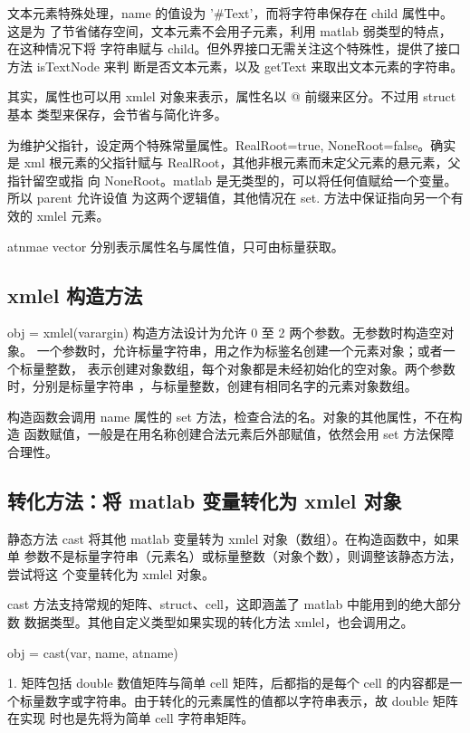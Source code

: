 文本元素特殊处理，name 的值设为 '#Text'，而将字符串保存在 child 属性中。这是为
了节省储存空间，文本元素不会用子元素，利用 matlab 弱类型的特点，在这种情况下将
字符串赋与 child。但外界接口无需关注这个特殊性，提供了接口方法 isTextNode 来判
断是否文本元素，以及 getText 来取出文本元素的字符串。

其实，属性也可以用 xmlel 对象来表示，属性名以 @ 前缀来区分。不过用 struct 基本
类型来保存，会节省与简化许多。

为维护父指针，设定两个特殊常量属性。RealRoot=true, NoneRoot=false。确实是 xml
根元素的父指针赋与 RealRoot，其他非根元素而未定父元素的悬元素，父指针留空或指
向 NoneRoot。matlab 是无类型的，可以将任何值赋给一个变量。所以 parent 允许设值
为这两个逻辑值，其他情况在 set. 方法中保证指向另一个有效的 xmlel 元素。

atnmae vector 分别表示属性名与属性值，只可由标量获取。

\subsection{xmlel 构造方法}

obj = xmlel(varargin) 构造方法设计为允许 0 至 2 两个参数。无参数时构造空对象。
一个参数时，允许标量字符串，用之作为标鉴名创建一个元素对象；或者一个标量整数，
表示创建对象数组，每个对象都是未经初始化的空对象。两个参数时，分别是标量字符串
，与标量整数，创建有相同名字的元素对象数组。

构造函数会调用 name 属性的 set 方法，检查合法的名。对象的其他属性，不在构造
函数赋值，一般是在用名称创建合法元素后外部赋值，依然会用 set 方法保障合理性。

\subsection{转化方法：将 matlab 变量转化为 xmlel 对象}

静态方法 cast 将其他 matlab 变量转为 xmlel 对象（数组）。在构造函数中，如果单
参数不是标量字符串（元素名）或标量整数（对象个数），则调整该静态方法，尝试将这
个变量转化为 xmlel 对象。

cast 方法支持常规的矩阵、struct、cell，这即涵盖了 matlab 中能用到的绝大部分数
数据类型。其他自定义类型如果实现的转化方法 xmlel，也会调用之。

obj = cast(var, name, atname)

1. 矩阵包括 double 数值矩阵与简单 cell 矩阵，后都指的是每个 cell 的内容都是一
个标量数字或字符串。由于转化的元素属性的值都以字符串表示，故 double 矩阵在实现
时也是先将为简单 cell 字符串矩阵。


